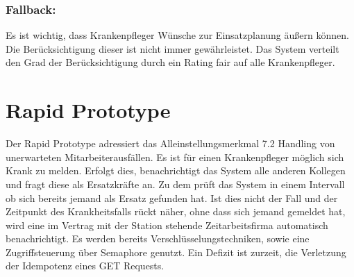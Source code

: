 \documentclass[10pt,a4paper]{article}
\begin{document}
\subsubsection{Fallback:}
Es ist wichtig, dass Krankenpfleger Wünsche zur Einsatzplanung äußern können. Die Berücksichtigung dieser ist nicht immer gewährleistet. Das System verteilt den Grad der Berücksichtigung durch ein Rating fair auf alle Krankenpfleger.
\section{Rapid Prototype}
Der Rapid Prototype adressiert das Alleinstellungsmerkmal 7.2 Handling von unerwarteten Mitarbeiterausfällen. Es ist für einen Krankenpfleger möglich sich Krank zu melden. Erfolgt dies, benachrichtigt das System alle anderen Kollegen und fragt diese als Ersatzkräfte an. Zu dem prüft das System in einem Intervall ob sich bereits jemand als Ersatz gefunden hat. Ist dies nicht der Fall und der Zeitpunkt des Krankheitsfalls rückt näher, ohne dass sich jemand gemeldet hat, wird eine im Vertrag mit der Station stehende Zeitarbeitsfirma automatisch benachrichtigt. Es werden bereits Verschlüsselungstechniken, sowie eine Zugriffsteuerung über Semaphore genutzt. Ein Defizit ist zurzeit, die Verletzung der Idempotenz eines GET Requests.
\end{document}
